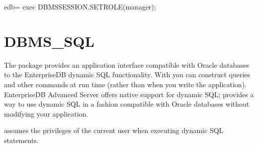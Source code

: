 \documentclass[letterpaper,10pt,english,openany,oneside]{sphinxmanual}
\begin{document}
%
\begin{sphinxVerbatim}[commandchars=\\\{\}]
edb=\PYGZsh{} exec DBMS\PYGZus{}SESSION.SET\PYGZus{}ROLE(\PYGZsq{}manager\PYGZsq{});
\end{sphinxVerbatim}

\newpage


\section{DBMS\_SQL}
\label{\detokenize{dbms_sql:dbms-sql}}\label{\detokenize{dbms_sql::doc}}
The  package provides an application interface compatible with
Oracle databases to the EnterpriseDB dynamic SQL functionality. With
 you can construct queries and other commands at run time
(rather than when you write the application). EnterpriseDB Advanced
Server offers native support for dynamic SQL;  provides a way
to use dynamic SQL in a fashion compatible with Oracle databases without
modifying your application.

 assumes the privileges of the current user when executing
dynamic SQL statements.
\end{document}
